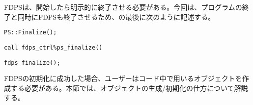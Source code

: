 FDPSは、開始したら明示的に終了させる必要がある。今回は、プログラムの終了と同時にFDPSも終了させるため、\mainFunc の最後に次のように記述する。
\ifCpp%
\begin{lstlisting}[caption=FDPSの終了]
PS::Finalize();
\end{lstlisting}
\endifCpp
\ifFtn%
\begin{lstlisting}[caption=FDPSの終了]
call fdps_ctrl%ps_finalize()
\end{lstlisting}
\endifFtn
\ifC%
\begin{lstlisting}[caption=FDPSの終了]
fdps_finalize();
\end{lstlisting}
\endifC

FDPSの初期化に成功した場合、ユーザーはコード中で用いるオブジェクトを作成する必要がある。本節では、オブジェクトの生成/初期化の仕方について解説する。

